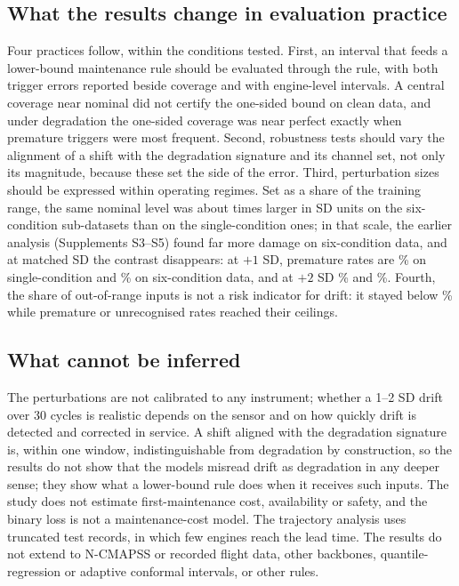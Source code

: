 \subsection{What the results change in evaluation practice}
Four practices follow, within the conditions tested. First, an interval that feeds a lower-bound maintenance rule should be evaluated through the rule, with both trigger errors reported beside coverage and with engine-level intervals. A central coverage near nominal did not certify the one-sided bound on clean data, and under degradation the one-sided coverage was near perfect exactly when premature triggers were most frequent. Second, robustness tests should vary the alignment of a shift with the degradation signature and its channel set, not only its magnitude, because these set the side of the error. Third, perturbation sizes should be expressed within operating regimes. Set as a share of the training range, the same nominal level was about \RVRatioFactor{} times larger in SD units on the six-condition sub-datasets than on the single-condition ones; in that scale, the earlier analysis (Supplements S3--S5) found far more damage on six-condition data, and at matched SD the contrast disappears: at $+1$ SD, premature rates are \RVPremOneSingle\% on single-condition and \RVPremOneSix\% on six-condition data, and at $+2$ SD \RVPremTwoSingle\% and \RVPremTwoSix\%. Fourth, the share of out-of-range inputs is not a risk indicator for drift: it stayed below \RVFoobTwo\% while premature or unrecognised rates reached their ceilings.

\subsection{What cannot be inferred}
The perturbations are not calibrated to any instrument; whether a 1--2 SD drift over 30 cycles is realistic depends on the sensor and on how quickly drift is detected and corrected in service. A shift aligned with the degradation signature is, within one window, indistinguishable from degradation by construction, so the results do not show that the models misread drift as degradation in any deeper sense; they show what a lower-bound rule does when it receives such inputs. The study does not estimate first-maintenance cost, availability or safety, and the binary loss is not a maintenance-cost model. The trajectory analysis uses truncated test records, in which few engines reach the lead time. The results do not extend to N-CMAPSS or recorded flight data, other backbones, quantile-regression or adaptive conformal intervals, or other rules.

